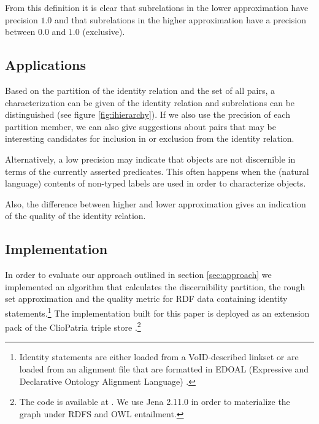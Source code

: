 \noindent From this definition it is clear that
    subrelations in the lower approximation have precision $1.0$
  and that
    subrelations in the higher approximation have a precision
      between $0.0$ and $1.0$ (exclusive).



\subsection{Applications}
\label{sec:applications}

Based on the partition of the identity relation and the set of all pairs,
  a characterization can be given of the identity relation
  and subrelations can be distinguished (see figure \ref{fig:ihierarchy}).
If we also use the precision of each partition member,
  we can also give suggestions about pairs that may be interesting candidates
  for inclusion in or exclusion from the identity relation.

Alternatively, a low precision may indicate that objects are not
  discernible in terms of the currently asserted predicates.
This often happens when the (natural language) contents of non-typed labels
  are used in order to characterize objects.

Also, the difference between higher and lower approximation
  gives an indication of the quality of the identity relation.



\subsection{Implementation}
\label{sec:implementation}

In order to evaluate our approach outlined in section \ref{sec:approach}
  we implemented an algorithm that calculates
  the discernibility partition, the rough set approximation and
  the quality metric
  for RDF data containing identity statements.\footnote{
      Identity statements are either loaded from a VoID-described
        linkset \cite{Void2011}
        or are loaded from an alignment file that are formatted in
        EDOAL (Expressive and Declarative Ontology Alignment Language)
        \cite{DavidEzenatScharffeTrojahn2011}.
    }
The implementation built for this paper is deployed as an extension pack
  of the ClioPatria triple store .\footnote{
      The code is available at {\small {}}.
      We use Jena 2.11.0 \cite{Carroll2004} in order to materialize
        the graph under RDFS and OWL entailment.
    }

